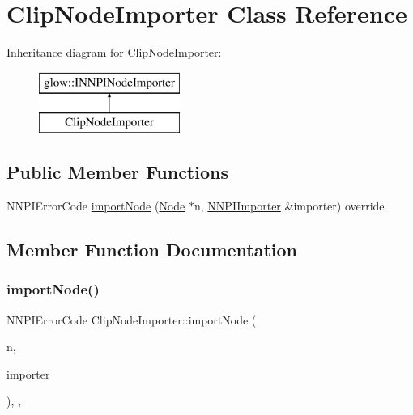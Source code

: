 \hypertarget{class_clip_node_importer}{}\section{Clip\+Node\+Importer Class Reference}
\label{class_clip_node_importer}
Inheritance diagram for Clip\+Node\+Importer\+:\begin{figure}[H]
\begin{center}
\leavevmode
\includegraphics[height=2.000000cm]{class_clip_node_importer}
\end{center}
\end{figure}
\subsection*{Public Member Functions}
\begin{DoxyCompactItemize}
\item 
N\+N\+P\+I\+Error\+Code \hyperlink{class_clip_node_importer_aaa662a0ecd2fffa7a14597c1f670df29}{import\+Node} (\hyperlink{classglow_1_1_node}{Node} $\ast$n, \hyperlink{classglow_1_1_n_n_p_i_importer}{N\+N\+P\+I\+Importer} \&importer) override
\end{DoxyCompactItemize}


\subsection{Member Function Documentation}
\mbox{\label{class_clip_node_importer_aaa662a0ecd2fffa7a14597c1f670df29}} 
\subsubsection{\texorpdfstring{import\+Node()}{importNode()}}
{\footnotesize\ttfamily N\+N\+P\+I\+Error\+Code Clip\+Node\+Importer\+::import\+Node (\begin{DoxyParamCaption}\item[{\hyperlink{classglow_1_1_node}{Node} $\ast$}]{n,  }\item[{\hyperlink{classglow_1_1_n_n_p_i_importer}{N\+N\+P\+I\+Importer} \&}]{importer }\end{DoxyParamCaption})\hspace{0.3cm}{\ttfamily [inline]}, {\ttfamily [override]}, {\ttfamily [virtual]}}

